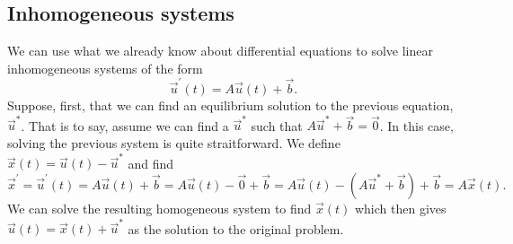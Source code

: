 \documentclass[../book.tex]{subfiles}
\begin{document}
\subsection{Inhomogeneous systems}

We can use what we already know about differential equations to solve linear inhomogeneous systems of the form
\begin{equation}\label{eq:inhomog}
  \vec{u}^{ \prime}(t) = A \vec{u}(t) + \vec{b}.
\end{equation}
Suppose, first, that we can find an equilibrium solution to the previous equation, \(\vec{u}^{ *}\). That is to say, assume we can find a \(\vec{u}^{ *}\) such that \(A \vec{u}^{ *} + \vec{b}=\vec{0}\). In this case, solving the previous system is quite straitforward. We define \(\vec{x}(t) = \vec{u}(t) - \vec{u}^{ *}\) and find
\begin{equation}\label{eq:sys-44}
\vec{x}^{ \prime} 
= \vec{u}^{ \prime}(t) 
= A \vec{u}(t) + \vec{b} 
= A \vec{u}(t) - \vec{0} + \vec{b} 
= A \vec{u}(t) - (A \vec{u}^{ *} + \vec{b}) + \vec{b} 
= A \vec{x}(t).
\end{equation}
We can solve the resulting homogeneous system to find \(\vec{x}(t)\) which then gives \(\vec{u}(t) = \vec{x}(t) + \vec{u}^{ *}\) as the solution to the original problem.
\end{document}
